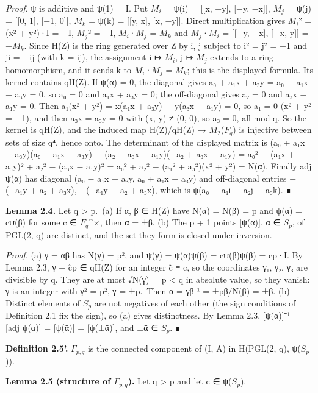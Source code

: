 \documentclass[
  10pt,
]{article}
\begin{document}
\emph{Proof.} ψ is additive and ψ(1) = I. Put \(M_{i}\) = ψ(i) =
{[}{[}x, −y{]}, {[}−y, −x{]}{]}, \(M_{j}\) = ψ(j) = {[}{[}0, 1{]},
{[}−1, 0{]}{]}, \(M_{k}\) = ψ(k) = {[}{[}y, x{]}, {[}x, −y{]}{]}. Direct
multiplication gives \(M_{i}\)² = (x² + y²)·I = −I, \(M_{j}\)² = −I,
\(M_{i}\)·\(M_{j}\) = \(M_{k}\) and \(M_{j}\)·\(M_{i}\) = {[}{[}−y,
−x{]}, {[}−x, y{]}{]} = −\(M_{k}\). Since H(Z) is the ring generated
over Z by i, j subject to i² = j² = −1 and ji = −ij (with k = ij), the
assignment i ↦ \(M_{i}\), j ↦ \(M_{j}\) extends to a ring homomorphism,
and it sends k to \(M_{i}\)·\(M_{j}\) = \(M_{k}\); this is the displayed
formula. Its kernel contains qH(Z). If ψ(α) = 0, the diagonal gives a₀ +
a₁x + a₃y = a₀ − a₁x − a₃y = 0, so a₀ = 0 and a₁x + a₃y = 0; the
off-diagonal gives a₂ = 0 and a₃x − a₁y = 0. Then a₁(x² + y²) = x(a₁x +
a₃y) − y(a₃x − a₁y) = 0, so a₁ = 0 (x² + y² = −1), and then a₃x = a₃y =
0 with (x, y) ≠ (0, 0), so a₃ = 0, all mod q. So the kernel is qH(Z),
and the induced map H(Z)/qH(Z) → \(M_{2}\)(\(F_{q}\)) is injective
between sets of size q⁴, hence onto. The determinant of the displayed
matrix is (a₀ + a₁x + a₃y)(a₀ − a₁x − a₃y) − (a₂ + a₃x − a₁y)(−a₂ + a₃x
− a₁y) = a₀² − (a₁x + a₃y)² + a₂² − (a₃x − a₁y)² = a₀² + a₂² − (a₁² +
a₃²)(x² + y²) = N(α). Finally adj ψ(α) has diagonal (a₀ − a₁x − a₃y, a₀
+ a₁x + a₃y) and off-diagonal entries −(−a₁y + a₂ + a₃x), −(−a₁y − a₂ +
a₃x), which is ψ(a₀ − a₁i − a₂j − a₃k). ∎

\textbf{Lemma 2.4.} Let q \textgreater{} p.~(a) If α, β ∈ H(Z) have N(α)
= N(β) = p and ψ(α) = cψ(β) for some c ∈ \(F_{q}\)\^{}×, then α = ±β.
(b) The p + 1 points {[}ψ(α){]}, α ∈ \(S_{p}\), of PGL(2, q) are
distinct, and the set they form is closed under inversion.

\emph{Proof.} (a) γ = αβ̄ has N(γ) = p², and ψ(γ) = ψ(α)ψ(β̄) = cψ(β)ψ(β̄)
= cp·I. By Lemma 2.3, γ − c̃p ∈ qH(Z) for an integer c̃ ≡ c, so the
coordinates γ₁, γ₂, γ₃ are divisible by q. They are at most √N(γ) = p
\textless{} q in absolute value, so they vanish: γ is an integer with γ²
= p², γ = ±p.~Then α = γβ̄⁻¹ = ±pβ/N(β) = ±β. (b) Distinct elements of
\(S_{p}\) are not negatives of each other (the sign conditions of
Definition 2.1 fix the sign), so (a) gives distinctness. By Lemma 2.3,
{[}ψ(α){]}⁻¹ = {[}adj ψ(α){]} = {[}ψ(ᾱ){]} = {[}ψ(±ᾱ){]}, and ±ᾱ ∈
\(S_{p}\). ∎

\textbf{Definition 2.5'.} \(Γ_{p,q}\) is the connected component of (I,
A) in H(PGL(2, q), ψ(\(S_{p}\))).

\textbf{Lemma 2.5 (structure of \(Γ_{p,q}\)).} Let q \textgreater{} p
and let c ∈ ψ(\(S_{p}\)).
\end{document}
